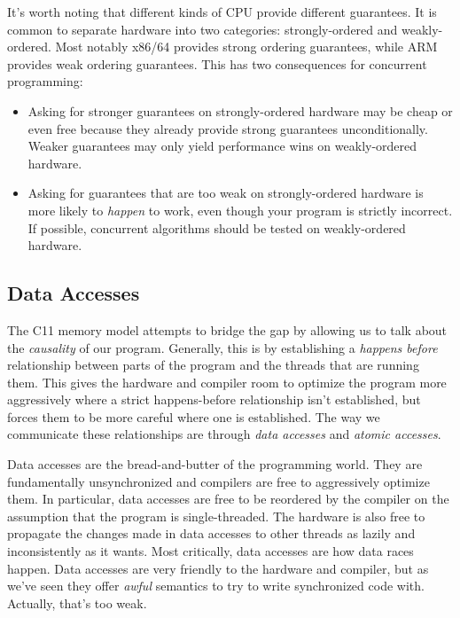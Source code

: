 \documentclass[a4paper,]{book}
\begin{document}
It's worth noting that different kinds of CPU provide different
guarantees. It is common to separate hardware into two categories:
strongly-ordered and weakly- ordered. Most notably x86/64 provides
strong ordering guarantees, while ARM provides weak ordering guarantees.
This has two consequences for concurrent programming:

\begin{itemize}
\item
  Asking for stronger guarantees on strongly-ordered hardware may be
  cheap or even free because they already provide strong guarantees
  unconditionally. Weaker guarantees may only yield performance wins on
  weakly-ordered hardware.
\item
  Asking for guarantees that are too weak on strongly-ordered hardware
  is more likely to \emph{happen} to work, even though your program is
  strictly incorrect. If possible, concurrent algorithms should be
  tested on weakly-ordered hardware.
\end{itemize}

\subsection{Data Accesses}\label{data-accesses}

The C11 memory model attempts to bridge the gap by allowing us to talk
about the \emph{causality} of our program. Generally, this is by
establishing a \emph{happens before} relationship between parts of the
program and the threads that are running them. This gives the hardware
and compiler room to optimize the program more aggressively where a
strict happens-before relationship isn't established, but forces them to
be more careful where one is established. The way we communicate these
relationships are through \emph{data accesses} and \emph{atomic
accesses}.

Data accesses are the bread-and-butter of the programming world. They
are fundamentally unsynchronized and compilers are free to aggressively
optimize them. In particular, data accesses are free to be reordered by
the compiler on the assumption that the program is single-threaded. The
hardware is also free to propagate the changes made in data accesses to
other threads as lazily and inconsistently as it wants. Most critically,
data accesses are how data races happen. Data accesses are very friendly
to the hardware and compiler, but as we've seen they offer \emph{awful}
semantics to try to write synchronized code with. Actually, that's too
weak.
\end{document}
